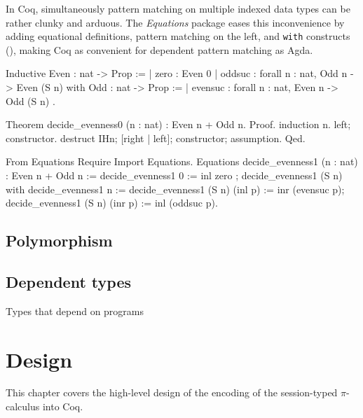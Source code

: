 \documentclass{mproj}
\newcommand{\picalc}{$\pi$-calculus}
\begin{document}
In Coq, simultaneously pattern matching on multiple indexed data types can be rather clunky and arduous. The \emph{Equations} package eases this inconvenience by adding equational definitions, pattern matching on the left, and \texttt{with} constructs (\cite{McBride2004}), making Coq as convenient for dependent pattern matching as Agda.

\begin{coq}
Inductive Even : nat -> Prop :=
| zero : Even 0
| oddsuc : forall {n : nat}, Odd n -> Even (S n)
with Odd : nat -> Prop :=
| evensuc : forall {n : nat}, Even n -> Odd (S n)
.

Theorem decide_evenness0 (n : nat) : Even n + Odd n.
Proof.
  induction n.
  left; constructor.
  destruct IHn; [right | left]; constructor; assumption.
Qed.

From Equations Require Import Equations.
Equations decide_evenness1 (n : nat) : Even n + Odd n := {
decide_evenness1 0 := inl zero ;
decide_evenness1 (S n) with decide_evenness1 n := {
decide_evenness1 (S n) (inl p) := inr (evensuc p);
decide_evenness1 (S n) (inr p) := inl (oddsuc p)}}.
\end{coq}


\section{Polymorphism}\label{polymorphism}

\cite{Wadler1989}

\section{Dependent types}\label{dependent-types}

Types that depend on programs

\chapter{Design}\label{design}


This chapter covers the high-level design of the encoding of the session-typed \picalc{} into Coq. 
\end{document}

